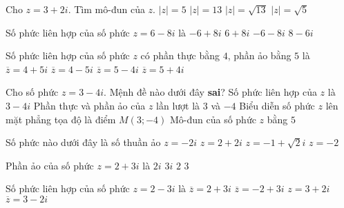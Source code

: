 \begin{ex}%
	Cho $z=3+2i$. Tìm mô-đun của $z$.
	\choice
	{$|z|=5$}
	{$|z|=13$}
	{\True $|z|=\sqrt{13}$}
	{$|z|=\sqrt{5}$}
\end{ex}
\begin{ex}%
	Số phức liên hợp của số phức $z=6-8i$ là
	\choice
	{$-6+8i$}
	{\True $6+8i$}
	{$-6-8i$}
	{$8-6i$}
\end{ex}
\begin{ex}%
	Số phức liên hợp của số phức $z$ có phần thực bằng $4$, phần ảo bằng $5$ là
	\choice
	{$\overline{z}=4+5i$}
	{\True $\overline{z}=4-5i$}
	{$\overline{z}=5-4i$}
	{$\overline{z}=5+4i$}
\end{ex}
\begin{ex}%
	Cho số phức $z=3-4i$. Mệnh đề nào dưới đây \textbf{sai}?
	\choice
	{\True Số phức liên hợp của $z$ là $3-4i$}
	{Phần thực và phần ảo của $z$ lần lượt là $3$ và $-4$}
	{Biểu diễn số phức $z$ lên mặt phẳng tọa độ là điểm $M(3;-4)$}
	{Mô-đun của số phức $z$ bằng $5$}
\end{ex}
\begin{ex}%
	Số phức nào dưới đây là số thuần ảo
	\choice
	{\True $z=-2i$}
	{$z=2+2i$}
	{$z=-1+\sqrt{2}i$}
	{$z=-2$}
\end{ex}
\begin{ex}%
	Phần ảo của số phức $z=2+3i$ là
	\choice
	{$2i$}
	{$3i$}
	{$2$}
	{\True $3$}
\end{ex}
\begin{ex}%
	Số phức liên hợp của số phức $z=2-3i$ là
	\choice
	{\True $\overline{z}=2+3i$}
	{$\overline{z}=-2+3i$}
	{$z=3+2i$}
	{$\overline{z}=3-2i$}
\end{ex}
